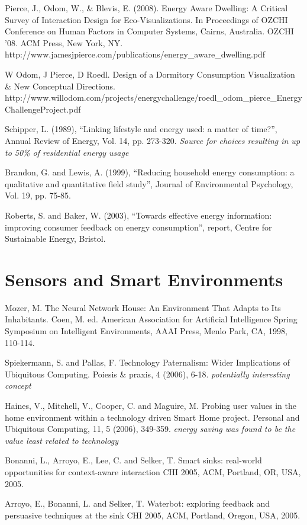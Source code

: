 Pierce, J., Odom, W., & Blevis, E. (2008). Energy Aware Dwelling: A Critical Survey of Interaction Design for Eco-Visualizations. In Proceedings of OZCHI Conference on Human Factors in Computer Systems, Cairns, Australia. OZCHI '08. ACM Press, New York, NY. http://www.jamesjpierce.com/publications/energy_aware_dwelling.pdf

W Odom, J Pierce, D Roedl. Design of a Dormitory Consumption Visualization & New Conceptual Directions. http://www.willodom.com/projects/energychallenge/roedl_odom_pierce_EnergyChallengeProject.pdf

Schipper, L. (1989), “Linking lifestyle and energy used: a matter of time?”, Annual Review of Energy, Vol. 14, pp. 273-320. \emph{Source for choices resulting in up to 50\% of residential energy usage}

Brandon, G. and Lewis, A. (1999), ``Reducing household energy consumption: a qualitative and quantitative ﬁeld study'', Journal of Environmental Psychology, Vol. 19, pp. 75-85.

Roberts, S. and Baker, W. (2003), “Towards effective energy information: improving consumer feedback on energy consumption”, report, Centre for Sustainable Energy, Bristol. 


\section{Sensors and Smart Environments}


Mozer, M. The Neural Network House: An Environment That Adapts to Its Inhabitants. Coen, M. ed. American Association for Artificial Intelligence Spring Symposium on Intelligent Environments, AAAI Press, Menlo Park, CA, 1998, 110-114.

Spiekermann, S. and Pallas, F. Technology Paternalism: Wider Implications of Ubiquitous Computing. Poiesis \& praxis, 4 (2006), 6-18. \emph{potentially interesting concept}

Haines, V., Mitchell, V., Cooper, C. and Maguire, M. Probing user values in the home environment within a technology driven Smart Home project. Personal and Ubiquitous Computing, 11, 5 (2006), 349-359. \emph{energy saving was found to be the value least related to technology}

Bonanni, L., Arroyo, E., Lee, C. and Selker, T. Smart sinks: real-world opportunities for context-aware interaction CHI 2005, ACM, Portland, OR, USA, 2005.

Arroyo, E., Bonanni, L. and Selker, T. Waterbot: exploring feedback and persuasive techniques at the sink CHI 2005, ACM, Portland, Oregon, USA, 2005.

